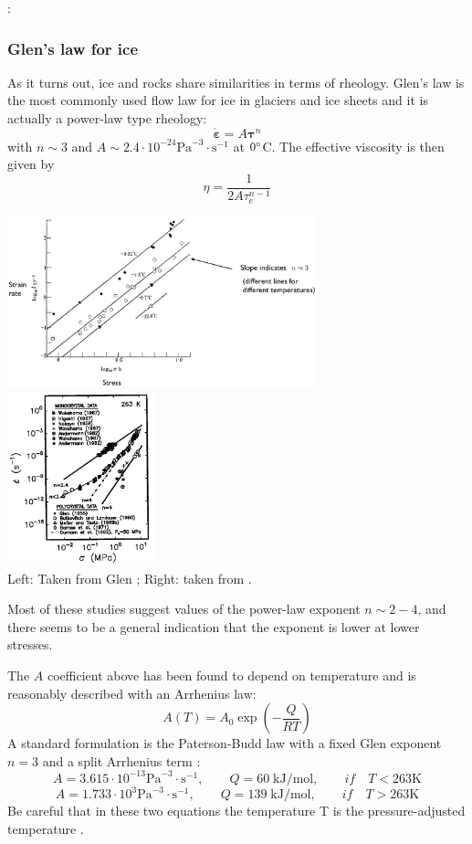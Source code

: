 \Literature: \cite{king16}

\subsubsection{Glen's law for ice}\label{ss:glen}

As it turns out, ice and rocks share similarities in terms of rheology.
Glen’s law is the most commonly used flow law for ice in glaciers and ice sheets \cite{glen55}
and it is actually a power-law type rheology:
\[
\dot{\bm \varepsilon} = A {\bm \tau}^n 
\]
with $n\sim 3$ and $A\sim 2.4\cdot 10^{-24} \text{Pa}^{-3}\cdot \text{s}^{-1}$ at $0\degree$C.
The effective viscosity is then given by
\[
\eta = \frac{1}{2 A \tau_e^{n-1}} 
\]
\begin{center}
\includegraphics[height=5cm]{images/rheology/glen}
\includegraphics[height=5cm]{images/rheology/goko01}\\
{\captionfont Left: Taken from Glen \cite{glen55}; Right: taken from \cite{goko01}.}
\end{center}
Most of these studies suggest values of the power-law exponent $n\sim 2-4$, and there seems to be 
a general indication that the exponent is lower at lower stresses.

The $A$ coefficient above has been found to depend on temperature and is reasonably described 
with an Arrhenius law:
\[
A(T)=A_0 \exp\left( -\frac{Q}{RT} \right)
\]
A standard formulation is the Paterson-Budd law with a fixed Glen exponent $n=3$ and 
a split Arrhenius term \cite{pabu82}:
\[
A=3.615 \cdot 10^{-13} \text{Pa}^{-3}\cdot \text{s}^{-1}, \qquad Q=60 \; \text{kJ}/\text{mol}, \qquad if\quad T<263\text{K} 
\]
\[
A=1.733\cdot 10^{3} \text{Pa}^{-3}\cdot \text{s}^{-1}, \qquad  Q=139 \; \text{kJ}/\text{mol}, \qquad if\quad T>263\text{K}
\]
Be careful that in these two equations the temperature T is the pressure-adjusted temperature \cite{pabu82}.


